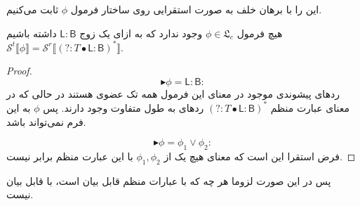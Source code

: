 این را با برهان خلف به صورت استقرایی روی ساختار فرمول $\phi$ ثابت می‌کنیم. 

\begin{thm}
	هیچ فرمول 
	$\phi \in \mathfrak{L}_e$ 
	وجود ندارد که به ازای یک زوج $\mathsf{L:B}$ داشته باشیم
	$\mathcal{S}^t \llbracket \phi \rrbracket = \mathcal{S}^r \llbracket \mathsf{(?:\mathit{T}\bullet \mathsf{L:B})^*} \rrbracket$.
\end{thm}
\begin{proof}
$$\blacktriangleright \phi = \mathsf{L:B}: $$
ردهای پیشوندی موجود در معنای این فرمول همه تک عضوی هستند در حالی که در معنای عبارت منظم 
$\mathsf{(?:\mathit{T}\bullet \mathsf{L:B})^*}$
ردهای به طول متفاوت وجود دارند. پس $\phi$ به این فرم نمی‌تواند باشد.

$$\blacktriangleright \phi = \phi_1 \lor \phi_2: $$
فرض استقرا این است که معنای هیچ یک از $\phi_1,\phi_2$ با این عبارت منظم برابر نیست.


\end{proof}

پس در این صورت لزوما هر چه که با عبارات منظم قابل بیان است، با  قابل بیان نیست.



















